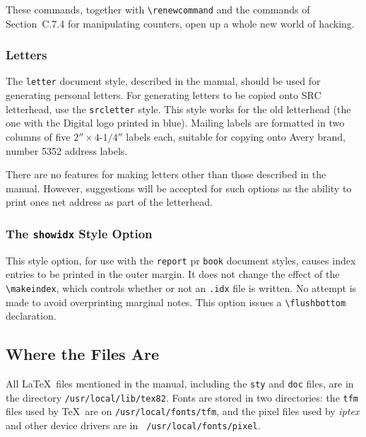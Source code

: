 These commands, together with \hbox{\verb|\renewcommand|} and the
commands of Section~C.7.4 for manipulating counters, open up a whole
new world of hacking.


\subsubsection{Letters} \label{sec:letters}

The \mbox{\tt letter} document style, described in the manual, should
be used for generating personal letters.  For generating letters to be
copied onto SRC letterhead, use the \mbox{\tt srcletter} style.  This
style works for the old letterhead (the one with the Digital logo
printed in blue).  Mailing labels are formatted in two columns of five
$2''\times\mbox{4-1/4}''$ labels each, suitable for copying onto Avery
brand, number 5352 address labels.

There are no features for making letters other than those described in
the manual.  However, suggestions will be accepted for such options as
the ability to print ones net address as part of the letterhead.

\subsubsection{The {\tt showidx} Style Option}

This style option, for use with the {\tt report} pr {\tt book} document
styles, causes index entries to be printed in the outer margin.  It
does not change the effect of the \verb|\makeindex|, which controls
whether or not an {\tt .idx} file is written.  No attempt is made to
avoid overprinting marginal notes.  This option issues a 
\verb|\flushbottom| declaration.


\subsection{Where the Files Are}

%

All \LaTeX\ files mentioned in the manual, including the {\tt sty} and
{\tt doc} files, are in the directory \mbox{\tt /usr/local/lib/tex82}.
Fonts are stored in two directories: the {\tt tfm} files used by \TeX\
are on \mbox{\tt /usr/local/fonts/tfm}, and the pixel files used by
{\em iptex\/} and other device drivers are in \mbox{\tt
/usr/local/fonts/pixel}.

